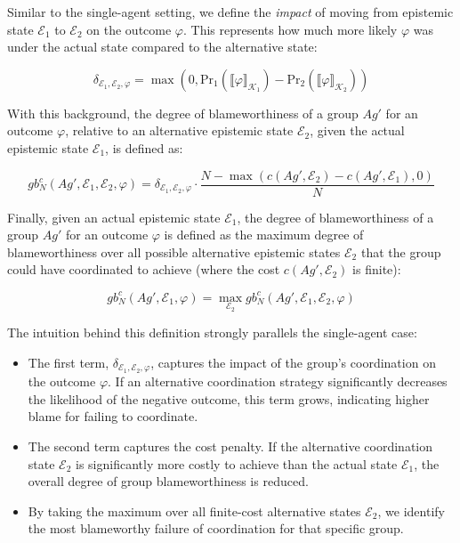 \documentclass{article}
\begin{document}
Similar to the single-agent setting, we define the \textit{impact} of moving from epistemic state $\mathcal{E}_1$ to $\mathcal{E}_2$ on the outcome $\varphi$. This represents how much more likely $\varphi$ was under the actual state compared to the alternative state:

\begin{equation}
  \delta_{\mathcal{E}_1,\mathcal{E}_2,\varphi} = \max(0, \text{Pr}_1(\llbracket \varphi \rrbracket_{\mathcal{K}_1}) - \text{Pr}_2(\llbracket \varphi \rrbracket_{\mathcal{K}_2}))
\label{eq:impact_group}
\end{equation}

With this background, the degree of blameworthiness of a group $Ag'$ for an outcome $\varphi$, relative to an alternative epistemic state $\mathcal{E}_2$, given the actual epistemic state $\mathcal{E}_1$, is defined as:

\begin{equation}
  gb^c_N(Ag', \mathcal{E}_1, \mathcal{E}_2, \varphi) = \delta_{\mathcal{E}_1,\mathcal{E}_2,\varphi} \cdot \frac{N - \max (c(Ag', \mathcal{E}_2) - c(Ag', \mathcal{E}_1), 0)}{N}
\label{eq:blameworthiness_group_relative}
\end{equation}

Finally, given an actual epistemic state $\mathcal{E}_1$, the degree of blameworthiness of a group $Ag'$ for an outcome $\varphi$ is defined as the maximum degree of blameworthiness over all possible alternative epistemic states $\mathcal{E}_2$ that the group could have coordinated to achieve (where the cost $c(Ag', \mathcal{E}_2)$ is finite):

\begin{equation}
  gb^c_N(Ag', \mathcal{E}_1, \varphi) = \max_{\mathcal{E}_2} gb^c_N(Ag', \mathcal{E}_1, \mathcal{E}_2, \varphi)
\label{eq:blameworthiness_group_max}
\end{equation}

The intuition behind this definition strongly parallels the single-agent case:

\begin{itemize}
  \item The first term, $\delta_{\mathcal{E}_1,\mathcal{E}_2,\varphi}$, captures the impact of the group's coordination on the outcome $\varphi$. If an alternative coordination strategy significantly decreases the likelihood of the negative outcome, this term grows, indicating higher blame for failing to coordinate.
  \item The second term captures the cost penalty. If the alternative coordination state $\mathcal{E}_2$ is significantly more costly to achieve than the actual state $\mathcal{E}_1$, the overall degree of group blameworthiness is reduced.
  \item By taking the maximum over all finite-cost alternative states $\mathcal{E}_2$, we identify the most blameworthy failure of coordination for that specific group.
\end{itemize}
\end{document}
